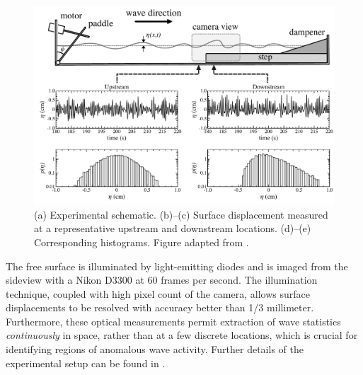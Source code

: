 \documentclass[11pt]{article}
\begin{document}
\begin{figure}%
\begin{center}
\includegraphics[width = 0.85 \linewidth]{Figs/ExpDiagStats.pdf}
\caption{
(a) Experimental schematic. 
(b)--(c) Surface displacement measured at a representative upstream and downstream locations. (d)--(e) Corresponding histograms. Figure adapted from \cite{bolles2019}.}
\label{ExpDiagStats}
\end{center}
\end{figure}
 
	The free surface is illuminated by light-emitting diodes and is imaged from the sideview with a Nikon D3300 at 60 frames per second. The illumination technique, coupled with high pixel count of the camera, allows surface displacements to be resolved with accuracy better than 1/3 millimeter. Furthermore, these optical measurements permit extraction of wave statistics {\em continuously} in space, rather than at a few discrete locations, which is crucial for identifying regions of anomalous wave activity. Further details of the experimental setup can be found in \cite{bolles2019}.
\end{document}
